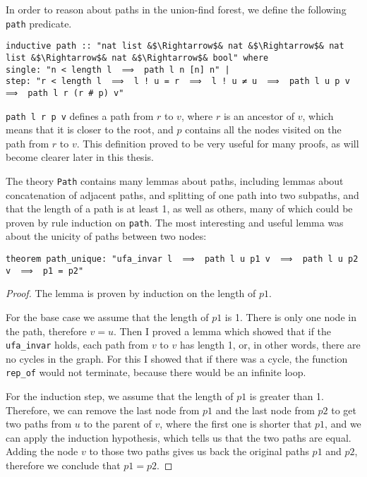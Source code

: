 In order to reason about paths in the union-find forest, we define the following \lstinline{path} predicate.

\begin{lstlisting}
inductive path :: "nat list &$\Rightarrow$& nat &$\Rightarrow$& nat list &$\Rightarrow$& nat &$\Rightarrow$& bool" where
single: "n < length l  ⟹  path l n [n] n" |
step: "r < length l  ⟹  l ! u = r  ⟹  l ! u ≠ u  ⟹  path l u p v  ⟹  path l r (r # p) v"
\end{lstlisting}

\lstinline{path l r p v} defines a path from $r$ to $v$, where $r$ is an ancestor of $v$, which means that it is closer to the root, and $p$ contains all the nodes visited on the path from $r$ to $v$. This definition proved to be very useful for many proofs, as will become clearer later in this thesis.

The theory \lstinline{Path} contains many lemmas about paths, including lemmas about concatenation of adjacent paths, and splitting of one path into two subpaths, and that the length of a path is at least 1, as well as others, many of which could be proven by rule induction on \lstinline{path}. The most interesting and useful lemma was about the unicity of paths between two nodes:

\begin{lstlisting}
theorem path_unique: "ufa_invar l  ⟹  path l u p1 v  ⟹  path l u p2 v  ⟹  p1 = p2"
\end{lstlisting}

\begin{proof}
The lemma is proven by induction on the length of $p1$.

For the base case we assume that the length of $p1$ is 1. There is only one node in the path, therefore $v = u$. Then I proved a lemma which showed that if the \lstinline{ufa_invar} holds, each path from $v$ to $v$ has length 1, or, in other words, there are no cycles in the graph. For this I showed that if there was a cycle, the function \lstinline{rep_of} would not terminate, because there would be an infinite loop.

For the induction step, we assume that the length of $p1$ is greater than 1. Therefore, we can remove the last node from $p1$ and the last node from $p2$ to get two paths from $u$ to the parent of $v$, where the first one is shorter that $p1$, and we can apply the induction hypothesis, which tells us that the two paths are equal. Adding the node $v$ to those two paths gives us back the original paths $p1$ and $p2$, therefore we conclude that $p1 = p2$.
\end{proof}

